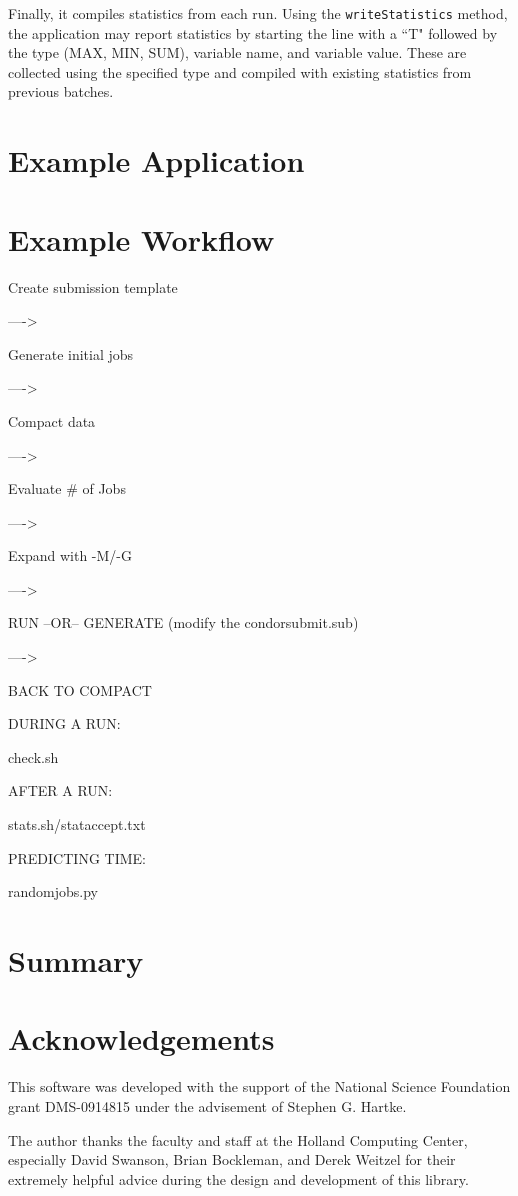 \documentclass[11pt]{article}
\begin{document}
Finally, it compiles statistics from each run.  
Using the \texttt{writeStatistics} method,
	the application may report statistics by starting the line with a ``T" followed by the
	type (MAX, MIN, SUM), variable name, and variable value.
These are collected using the specified type and compiled with existing statistics from previous batches.






\section{Example Application}
\label{sec:Example}



\section{Example Workflow}
\label{sec:workflow}

Create submission template

---->

Generate initial jobs

---->

Compact data

---->

Evaluate \# of Jobs

---->

Expand with -M/-G

---->

RUN  --OR-- GENERATE (modify the condorsubmit.sub)

---->

BACK TO COMPACT

DURING A RUN:

check.sh

AFTER A RUN:

stats.sh/stataccept.txt


PREDICTING TIME:

randomjobs.py


\section{Summary}
\label{sec:Summary}


\section{Acknowledgements}

This software was developed with the support of the National Science Foundation grant DMS-0914815
	under the advisement of Stephen G. Hartke.

The author thanks the faculty and staff
	at the Holland Computing Center,
	especially David Swanson, Brian Bockleman, and Derek Weitzel for their extremely helpful advice
	during the design and development of this library.






\end{document}
